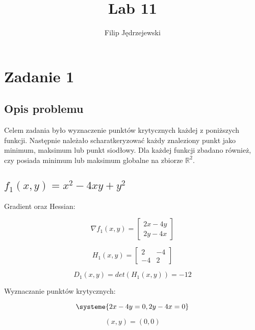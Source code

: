 \documentclass{article}
\title{Lab 11}
\author{Filip Jędrzejewski}
\begin{document}
	\maketitle

	
	\section*{Zadanie 1}


	\subsection*{Opis problemu}

	Celem zadania było wyznaczenie punktów krytycznych każdej z poniższych funkcji. Następnie należało scharatkeryzować każdy znaleziony punkt jako minimum, maksimum lub punkt siodłowy. Dla każdej funkcji zbadano również, czy posiada minimum lub maksimum globalne na zbiorze $\mathbb{R}^2$.

	\subsection*{$f_1(x,y) = x^2 - 4xy + y^2$}

	Gradient oraz Hessian:

	\begin{equation}
		\nabla f_1(x,y) = \begin{bmatrix} 2x-4y \\ 2y-4x \end{bmatrix}
	\end{equation}

	\begin{equation}
		H_1(x,y) = \begin{bmatrix} 2 & -4\\ -4 & 2\end{bmatrix}
	\end{equation}

	\begin{equation}
		D_1(x,y) = det(H_1(x,y)) = -12
	\end{equation}

	Wyznaczanie punktów krytycznych:

	\begin{equation}
		\systeme{2x-4y = 0,2y - 4x = 0}
	\end{equation}

	\begin{equation}
		(x,y) = (0,0)
	\end{equation}
\end{document}
